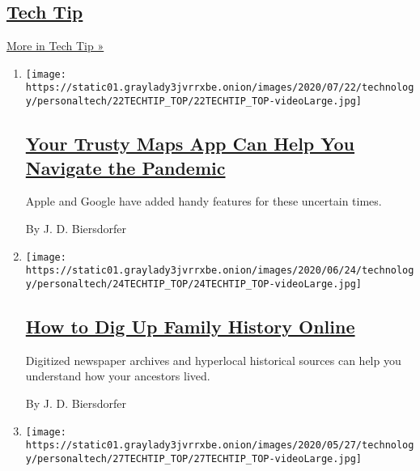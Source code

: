\hypertarget{tech-tip}{%
\subsection{\texorpdfstring{\href{/column/tech-tip}{Tech
Tip}}{Tech Tip}}\label{tech-tip}}

\href{/column/tech-tip}{More in Tech Tip »}

\begin{enumerate}
\def\labelenumi{\arabic{enumi}.}
\item
  \texttt{[image: https://static01.graylady3jvrrxbe.onion/images/2020/07/22/technology/personaltech/22TECHTIP\_TOP/22TECHTIP\_TOP-videoLarge.jpg]}

  \hypertarget{your-trusty-maps-app-can-help-you-navigate-the-pandemic}{%
  \subsection{\texorpdfstring{\href{/2020/07/22/technology/personaltech/maps-apps-coronavirus-pandemic.html}{Your
  Trusty Maps App Can Help You Navigate the
  Pandemic}}{Your Trusty Maps App Can Help You Navigate the Pandemic}}\label{your-trusty-maps-app-can-help-you-navigate-the-pandemic}}

  Apple and Google have added handy features for these uncertain times.

  By J. D. Biersdorfer
\item
  \texttt{[image: https://static01.graylady3jvrrxbe.onion/images/2020/06/24/technology/personaltech/24TECHTIP\_TOP/24TECHTIP\_TOP-videoLarge.jpg]}

  \hypertarget{how-to-dig-up-family-history-online}{%
  \subsection{\texorpdfstring{\href{/2020/06/24/technology/personaltech/family-history-genealogy-online.html}{How
  to Dig Up Family History
  Online}}{How to Dig Up Family History Online}}\label{how-to-dig-up-family-history-online}}

  Digitized newspaper archives and hyperlocal historical sources can
  help you understand how your ancestors lived.

  By J. D. Biersdorfer
\item
  \texttt{[image: https://static01.graylady3jvrrxbe.onion/images/2020/05/27/technology/personaltech/27TECHTIP\_TOP/27TECHTIP\_TOP-videoLarge.jpg]}

  \hypertarget{space-out-and-explore-the-universe-without-leaving-home}{%
}
\end{enumerate}

